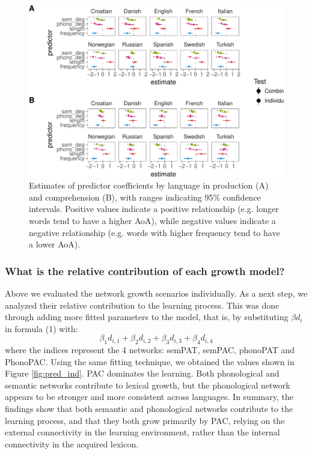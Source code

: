 \documentclass[english,floatsintext,man]{apa6}
\theoremstyle{definition}
\theoremstyle{definition}
\theoremstyle{definition}
\theoremstyle{remark}
\begin{document}
\begin{figure}[!h]
\includegraphics[width=\textwidth]{ms_files/figure-latex/staticPred-1} \caption{Estimates of predictor coefficients by language in production (A) and comprehension (B), with ranges indicating 95\% confidence intervals. Positive values indicate a positive relationship (e.g. longer words tend to have a higher AoA), while negative values indicate a negative relationship (e.g. words with higher frequency tend to have a lower AoA).}\label{fig:staticPred}
\end{figure}

\subsubsection{What is the relative contribution of each growth
model?}\label{what-is-the-relative-contribution-of-each-growth-model}

Above we evaluated the network growth scenarios individually. As a next
step, we analyzed their relative contribution to the learning process.
This was done through adding more fitted parameters to the model, that
is, by substituting \(\beta d_i\) in formula (1) with:
\[\beta_{1} d_{i, 1} + \beta_{2} d_{i, 2} + \beta_{3} d_{i, 3} + \beta_{4} d_{i, 4}\]
where the indices represent the 4 networks: semPAT, semPAC, phonoPAT and
PhonoPAC. Using the same fitting technique, we obtained the values shown
in Figure \ref{fig:pred_ind}. PAC dominates the learning. Both
phonological and semantic networks contribute to lexical growth, but the
phonological network appears to be stronger and more consistent across
languages. In summary, the findings show that both semantic and
phonological networks contribute to the learning process, and that they
both grow primarily by PAC, relying on the external connectivity in the
learning environment, rather than the internal connectivity in the
acquired lexicon.
\end{document}
